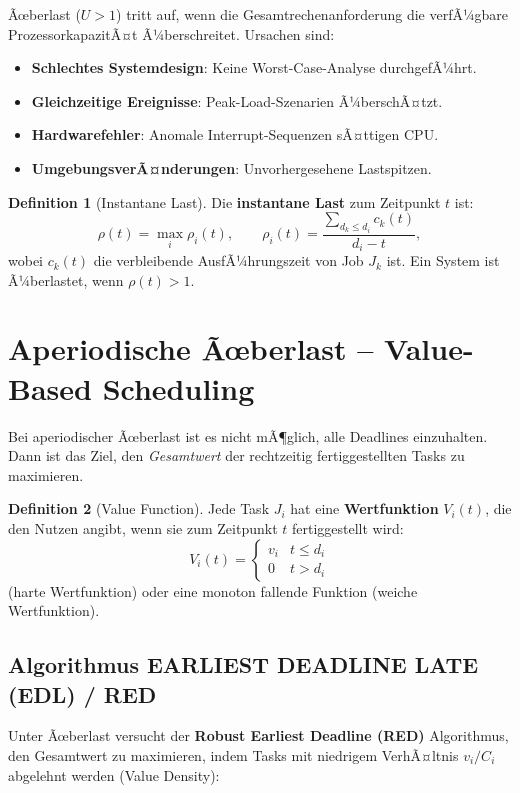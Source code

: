 ﻿\documentclass[a4paper,12pt]{report}
\theoremstyle{definition}
\newtheorem{definition}{Definition}[chapter]
\begin{document}
Ãœberlast ($U > 1$) tritt auf, wenn die Gesamtrechenanforderung die verfÃ¼gbare
ProzessorkapazitÃ¤t Ã¼berschreitet. Ursachen sind:
\begin{itemize}
	\item \textbf{Schlechtes Systemdesign}: Keine Worst-Case-Analyse durchgefÃ¼hrt.
	\item \textbf{Gleichzeitige Ereignisse}: Peak-Load-Szenarien Ã¼berschÃ¤tzt.
	\item \textbf{Hardwarefehler}: Anomale Interrupt-Sequenzen sÃ¤ttigen CPU.
	\item \textbf{UmgebungsverÃ¤nderungen}: Unvorhergesehene Lastspitzen.
\end{itemize}

\begin{definition}[Instantane Last]
	Die \textbf{instantane Last} zum Zeitpunkt $t$ ist:
	\[
		\rho(t) = \max_i \rho_i(t), \qquad
		\rho_i(t) = \frac{\sum_{d_k \leq d_i} c_k(t)}{d_i - t},
	\]
	wobei $c_k(t)$ die verbleibende AusfÃ¼hrungszeit von Job $J_k$ ist.
	Ein System ist Ã¼berlastet, wenn $\rho(t) > 1$.
\end{definition}

\section{Aperiodische Ãœberlast -- Value-Based Scheduling}

Bei aperiodischer Ãœberlast ist es nicht mÃ¶glich, alle Deadlines einzuhalten.
Dann ist das Ziel, den \emph{Gesamtwert} der rechtzeitig fertiggestellten Tasks
zu maximieren.

\begin{definition}[Value Function]
	Jede Task $J_i$ hat eine \textbf{Wertfunktion} $V_i(t)$, die den Nutzen angibt,
	wenn sie zum Zeitpunkt $t$ fertiggestellt wird:
	\[
		V_i(t) = \begin{cases} v_i & t \leq d_i \\ 0 & t > d_i \end{cases}
	\]
	(harte Wertfunktion) oder eine monoton fallende Funktion (weiche Wertfunktion).
\end{definition}

\subsection{Algorithmus EARLIEST DEADLINE LATE (EDL) / RED}

Unter Ãœberlast versucht der \textbf{Robust Earliest Deadline (RED)} Algorithmus,
den Gesamtwert zu maximieren, indem Tasks mit niedrigem VerhÃ¤ltnis $v_i/C_i$
abgelehnt werden (Value Density):
\end{document}
